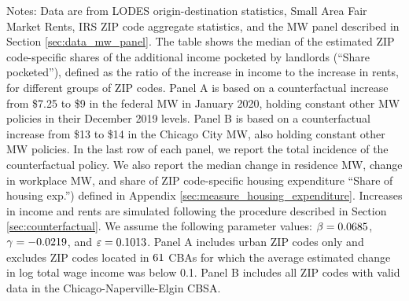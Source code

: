 \begin{table}[hbt!]
    \begin{minipage}{.95\textwidth} \footnotesize
        \vspace{3.5mm}
        Notes: 
        Data are from LODES origin-destination statistics, 
        Small Area Fair Market Rents, 
        IRS ZIP code aggregate statistics, and 
        the MW panel described in Section \ref{sec:data_mw_panel}.
        The table shows the median of the estimated ZIP code-specific shares of 
        the additional income pocketed by landlords (``Share pocketed''), 
        defined as the ratio of the increase in income to the increase in rents,
        for different groups of ZIP codes.
        Panel A is based on a counterfactual increase from \$7.25 to \$9 in the 
        federal MW in January 2020, holding constant other MW policies in their 
        December 2019 levels.
        Panel B is based on a counterfactual increase from \$13 to \$14 in the 
        Chicago City MW, also holding constant other MW policies.
        In the last row of each panel, we report the total incidence of the 
        counterfactual policy.
        We also report the median change in residence MW, change in workplace MW,
        and share of ZIP code-specific housing expenditure ``Share of housing 
        exp.'') defined in Appendix \ref{sec:measure_housing_expenditure}.
        Increases in income and rents are simulated following the procedure 
        described in Section \ref{sec:counterfactual}.
        We assume the following parameter values: 
        $\beta = 0.0685$, $\gamma = -0.0219$, and $\varepsilon = 0.1013$.
        Panel A includes urban ZIP codes only and excludes ZIP codes located 
        in $\textnormal{61}$ CBAs for which the average estimated change in 
        log total wage income was below 0.1.
        Panel B includes all ZIP codes with valid data in the 
        Chicago-Naperville-Elgin CBSA.
    \end{minipage}
\end{table}


